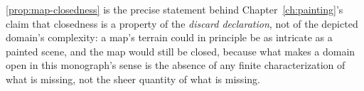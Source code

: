 \cref{prop:map-closedness} is the precise statement behind
Chapter~\ref{ch:painting}'s claim that closedness is a property of the
\emph{discard declaration}, not of the depicted domain's complexity: a
map's terrain could in principle be as intricate as a painted scene, and
the map would still be closed, because what makes a domain open in this
monograph's sense is the absence of any finite characterization of what
is missing, not the sheer quantity of what is missing.
